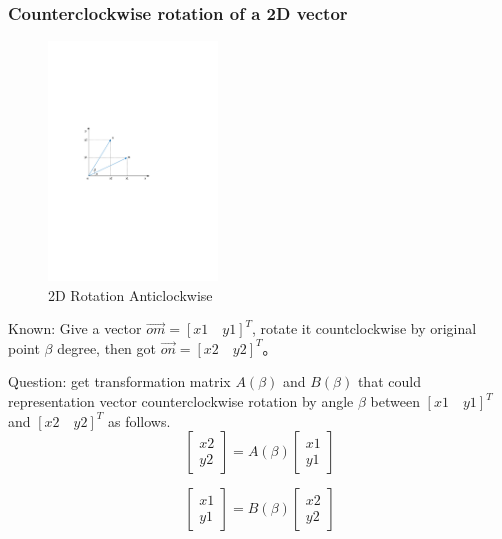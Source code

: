 \documentclass{article} %
\numberwithin{equation}{section} %
\begin{document}
\subsubsection{Counterclockwise rotation of a 2D vector}

\begin{figure}[htbp]
\centering
\includegraphics[width=0.40\textwidth]{derive_2d_rotation_matrix_anticlockwise.pdf}
\caption{2D Rotation Anticlockwise}
\end{figure}

Known: Give a vector $\overrightarrow{om}=[x1\quad y1]^T$, rotate it countclockwise by original point $\beta$ degree, 
then got $\overrightarrow{on}=[x2\quad y2]^T$。

Question: get transformation matrix $A(\beta)$ and $B(\beta)$ that could representation vector counterclockwise rotation by angle $\beta$ between $[x1\quad y1]^T$ and $[x2\quad y2]^T$ as follows.
\begin{equation}
\begin{bmatrix}x2\\y2\end{bmatrix}=A(\beta)\begin{bmatrix}x1\\y1\end{bmatrix}
\end{equation}

\begin{equation}
\begin{bmatrix}x1\\y1\end{bmatrix}=B(\beta)\begin{bmatrix}x2\\y2\end{bmatrix}
\end{equation}
\end{document}
